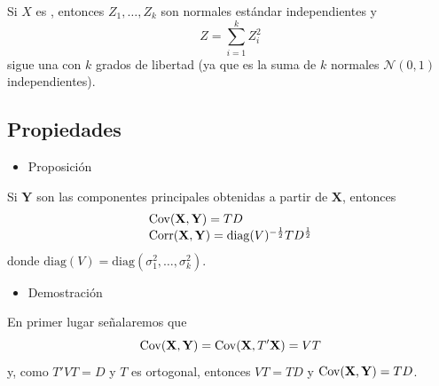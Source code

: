 Si $X$ es , entonces $Z_1,\dots,Z_k$ son normales estándar independientes y \[ Z=\sum_{i=1}^{k}Z_i^2 \]sigue una  con $k$ grados de libertad (ya que es la suma de $k$ normales $\mathcal{N}(0,1)$ independientes).
\subsection{Propiedades}
\begin{itemize}[label=\color{red}\textbullet, leftmargin=*]
	\item \color{lightblue}Proposición
\end{itemize}
Si $\mathbf{Y}$ son las componentes principales obtenidas a partir de $\mathbf{X}$, entonces \[ \begin{array}{l}
	\operatorname{Cov}(\mathbf{X,Y})=TD\\
	\operatorname{Corr}(\mathbf{X,Y})=\mathrm{diag}(V)^{-\frac{1}{2}}TD^{\frac{1}{2}}
\end{array} \] donde $\mathrm{diag}(V)=\mathrm{diag}(\sigma_1^2,\dots,\sigma_k^2)$.
\begin{itemize}[label=\color{red}\textbullet, leftmargin=*]
	\item \color{lightblue}Demostración
\end{itemize}
En primer lugar señalaremos que \[ \operatorname{Cov}(\mathbf{X,Y})=\operatorname{Cov}(\mathbf{X},T'\mathbf{X})=VT \] y, como $T'VT=D$ y $T$ es ortogonal, entonces $VT=TD$ y $\operatorname{Cov}(\mathbf{X,Y})=TD$.

